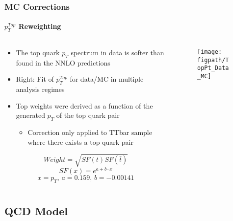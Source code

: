 \begin{frame}
	\frametitle{MC Corrections}
	\framesubtitle{$p_{T}^{Top}$ Reweighting}
	\vspace*{-0.34cm}
	\begin{columns}[T]
		\begin{column}{0.5\textwidth}
			\begin{block}{}
				\begin{itemize}
					\item The top quark $p_{T}$ spectrum in data is softer than found in the NNLO predictions
					\item Right: Fit of $p_{T}^{Top}$ for data/MC in multiple analysis regimes
					\item Top weights were derived as a function of the generated $p_{T}$ of the top quark pair
					\begin{itemize}
						\item Correction only applied to TTbar sample where there exists a top quark pair
					\end{itemize}
				\end{itemize}
				\begin{equation}\label{eq:ttbar_weight_1}
				Weight=\sqrt{SF\left(t\right)SF\left(\bar{t}\right)}
				\end{equation}
				\begin{equation}\label{eq:ttbar_weight_2}
				SF\left(x\right)=e^{a+b{\cdot}x}
				\end{equation}
				\begin{equation}\label{eq:ttbar_weight_2}
				x=p_{T}\text{, }a=0.159\text{, }b=-0.00141
				\end{equation}
			\end{block}
		\end{column}
		\begin{column}{0.46\textwidth}
			\vspace*{0.5cm}
			\begin{figure}
				\centering
				\texttt{[image: \\figpath/TopPt\_Data\_MC]}
			\end{figure}
		\end{column}
	\end{columns}

\end{frame}


\subsection*{QCD Model}


